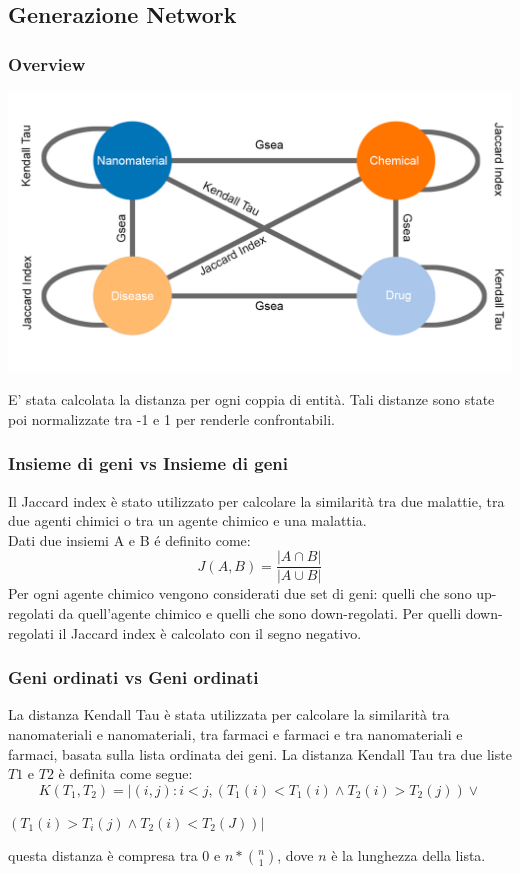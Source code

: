 \documentclass{beamer}
\begin{document}
\subsection{Generazione Network}
\begin{frame}
\frametitle{Overview}
\begin{center}
\includegraphics[scale=0.20]{img/Grafo.png}
\end{center}
E' stata calcolata la distanza per ogni coppia di entità. Tali distanze sono state poi normalizzate tra -1 e 1 per renderle confrontabili.
\end{frame}

\begin{frame}
\frametitle{Insieme di geni vs Insieme di geni}
Il Jaccard index è stato utilizzato per calcolare la similarità tra due malattie, tra due agenti chimici o tra un agente chimico e una malattia.\\
Dati due insiemi A e B \'e definito come:
\begin{equation} 
J(A, B) = \frac{|A \cap B|}{|A \cup  B|}
\end{equation}
Per ogni agente chimico vengono considerati due set di geni: quelli che sono up-regolati da quell'agente chimico e quelli che sono down-regolati.
Per quelli down-regolati il Jaccard index è calcolato con il segno negativo.
\end{frame}

\begin{frame}
\frametitle{Geni ordinati vs Geni ordinati}
La distanza Kendall Tau è stata utilizzata per calcolare la similarità tra nanomateriali e nanomateriali, tra farmaci e farmaci e tra nanomateriali e farmaci, basata sulla lista ordinata dei geni.
La distanza Kendall Tau tra due liste $T1$ e $T2$ è definita come segue:
\begin{equation}
K(T_1, T_2) = |(i, j): i < j, (T_1(i) < T_1(i) \wedge  T_2(i) > T_2(j)) \vee
\end{equation}
\begin{center}
	$ (T_1(i) > T_i(j) \wedge T_2(i) < T_2(J))  | $
\end{center}
questa distanza è compresa tra 0 e $n*\binom{n}{1}$, dove $n$ è la lunghezza della lista. 
\end{frame}
\end{document}

